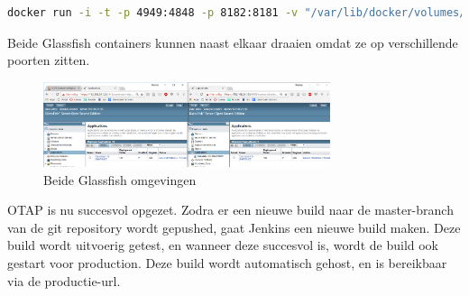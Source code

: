 \documentclass[12pt]{article}
\begin{document}
\begin{lstlisting}[language=Bash]
docker run -i -t -p 4949:4848 -p 8182:8181 -v "/var/lib/docker/volumes/jenkins_home/_data/workspace/Production/target":/glassfish5/glassfish/domains/domain1/autodeploy oracle/glassfish:latest
\end{lstlisting}

Beide Glassfish containers kunnen naast elkaar draaien omdat ze op verschillende poorten zitten.

\begin{figure}[H]
	\begin{center}
		\includegraphics[width=0.75\textwidth]{images/glassfishomgevingen.PNG}
		\caption{Beide Glassfish omgevingen\label{fig:glassfishomgevingen}}
	\end{center}
\end{figure}

OTAP is nu succesvol opgezet. Zodra er een nieuwe build naar de master-branch van de git repository wordt gepushed, gaat Jenkins een nieuwe build maken. Deze build wordt uitvoerig getest, en wanneer deze succesvol is, wordt de build ook gestart voor production. Deze build wordt automatisch gehost, en is bereikbaar via de productie-url.
\end{document}

